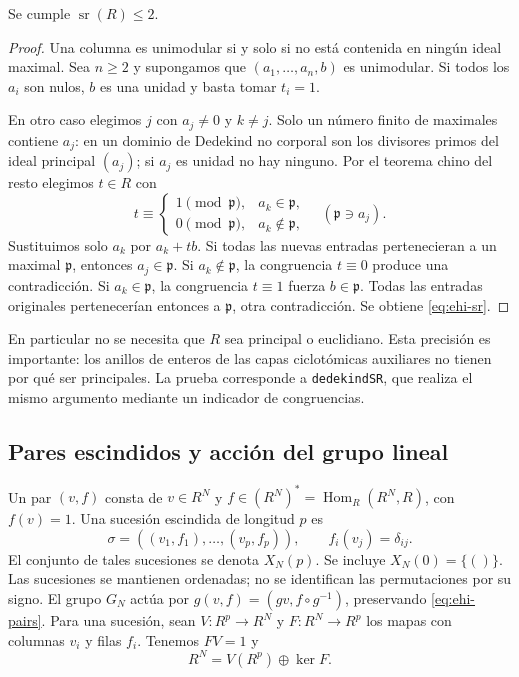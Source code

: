\begin{proposicion}
\label{prop:ehi-sr}
Se cumple $\operatorname{sr}(R)\le2$.
\end{proposicion}
\begin{proof}
Una columna es unimodular si y solo si no está contenida en ningún ideal maximal. Sea $n\ge2$ y supongamos que $(a_1,\ldots,a_n,b)$ es unimodular. Si todos los $a_i$ son nulos, $b$ es una unidad y basta tomar $t_i=1$.

En otro caso elegimos $j$ con $a_j\ne0$ y $k\ne j$. Solo un número finito de maximales contiene $a_j$: en un dominio de Dedekind no corporal son los divisores primos del ideal principal $(a_j)$; si $a_j$ es unidad no hay ninguno. Por el teorema chino del resto elegimos $t\in R$ con
\[
 t\equiv\begin{cases}1\pmod{\mathfrak p},&a_k\in\mathfrak p,\\
 0\pmod{\mathfrak p},&a_k\notin\mathfrak p,
 \end{cases}\quad(\mathfrak p\ni a_j).
\]
Sustituimos solo $a_k$ por $a_k+tb$. Si todas las nuevas entradas pertenecieran a un maximal $\mathfrak p$, entonces $a_j\in\mathfrak p$. Si $a_k\notin\mathfrak p$, la congruencia $t\equiv0$ produce una contradicción. Si $a_k\in\mathfrak p$, la congruencia $t\equiv1$ fuerza $b\in\mathfrak p$. Todas las entradas originales pertenecerían entonces a $\mathfrak p$, otra contradicción. Se obtiene \eqref{eq:ehi-sr}.
\end{proof}

En particular no se necesita que $R$ sea principal o euclidiano. Esta precisión es importante: los anillos de enteros de las capas ciclotómicas auxiliares no tienen por qué ser principales. La prueba corresponde a \texttt{dedekindSR}, que realiza el mismo argumento mediante un indicador de congruencias.

\subsection{Pares escindidos y acción del grupo lineal}

Un par $(v,f)$ consta de $v\in R^N$ y $f\in (R^N)^*=\operatorname{Hom}_R(R^N,R)$, con $f(v)=1$. Una sucesión escindida de longitud $p$ es
\begin{equation}
 \sigma=((v_1,f_1),\ldots,(v_p,f_p)),\qquad f_i(v_j)=\delta_{ij}.
 \label{eq:ehi-pairs}
\end{equation}
El conjunto de tales sucesiones se denota $X_N(p)$. Se incluye $X_N(0)=\{()\}$. Las sucesiones se mantienen ordenadas; no se identifican las permutaciones por su signo. El grupo $G_N$ actúa por $g(v,f)=(gv,f\circ g^{-1})$, preservando \eqref{eq:ehi-pairs}. Para una sucesión, sean $V:R^p\to R^N$ y $F:R^N\to R^p$ los mapas con columnas $v_i$ y filas $f_i$. Tenemos $FV=1$ y
\begin{equation}
 R^N=V(R^p)\oplus\ker F.
 \label{eq:ehi-split}
\end{equation}

